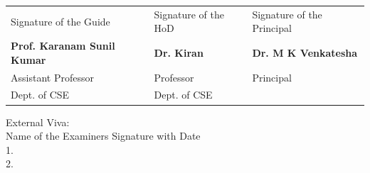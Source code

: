 \vspace{1 cm}
\begin{center}

\begin{table}[ht]
\centering
\begin{tabular}{p{5.5cm} p{5.5cm} p{5.5cm} }
Signature of the Guide & Signature of the HoD & Signature of the Principal \\
\textbf{Prof. Karanam Sunil Kumar} & \textbf{Dr. Kiran}  & \textbf{Dr. M K Venkatesha}\\
Assistant Professor & Professor & Principal \\ 
Dept. of CSE  & Dept. of CSE & \\ 
\end{tabular}

\end{table} 

\end{center}

\vspace{0.5cm}
\begin{flushleft}
External Viva:\\
Name of the Examiners         \hspace{5cm}          Signature with Date  \\
1.  \\
2. \\ 
			
\end{flushleft}
\thispagestyle{empty}




